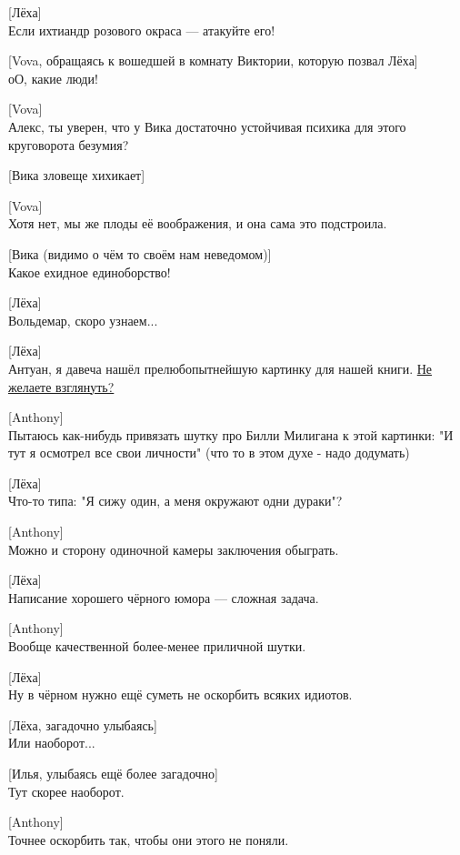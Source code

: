 [Лёха]\\
Если ихтиандр розового окраса — атакуйте его!


[Vova, обращаясь к вошедшей в комнату Виктории, которую позвал Лёха]\\
оО, какие люди!


[Vova]\\
Алекс, ты уверен, что у Вика достаточно устойчивая психика для этого круговорота безумия?


[Вика зловеще хихикает]


[Vova]\\
Хотя нет, мы же плоды её воображения, и она сама это подстроила.


[Вика (видимо о чём то своём нам неведомом)]\\
Какое ехидное единоборство!


[Лёха]\\
Вольдемар, скоро узнаем...


[Лёха]\\
Антуан, я давеча нашёл прелюбопытнейшую картинку для нашей книги. \href{http://cs8.pikabu.ru/post_img/2016/10/14/5/1476431396146890414.jpg}{Не желаете взглянуть?}


[Anthony]\\
Пытаюсь как-нибудь привязать шутку про Билли Милигана к этой картинки: "И тут я осмотрел все свои личности" (что то в этом духе - надо додумать)


[Лёха]\\
Что-то типа: "Я сижу один, а меня окружают одни дураки"?


[Anthony]\\
Можно и сторону одиночной камеры заключения обыграть.


[Лёха]\\
Написание хорошего чёрного юмора — сложная задача.


[Anthony]\\
Вообще качественной более-менее приличной шутки.


[Лёха]\\
Ну в чёрном нужно ещё суметь не оскорбить всяких идиотов.


[Лёха, загадочно улыбаясь]\\
Или наоборот...


[Илья, улыбаясь ещё более загадочно]\\
Тут скорее наоборот.


[Anthony]\\
Точнее оскорбить так, чтобы они этого не поняли.


